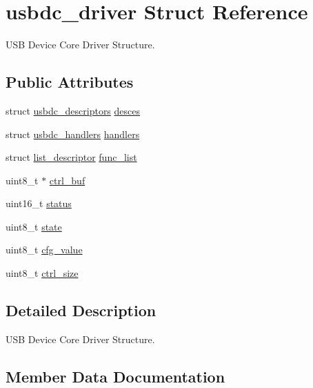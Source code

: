 \hypertarget{structusbdc__driver}{}\section{usbdc\+\_\+driver Struct Reference}
\label{structusbdc__driver}


U\+SB Device Core Driver Structure.  


\subsection*{Public Attributes}
\begin{DoxyCompactItemize}
\item 
struct \hyperlink{structusbdc__descriptors}{usbdc\+\_\+descriptors} \hyperlink{structusbdc__driver_a5653047038bd63ea3973ab3a1e2bc717}{desces}
\item 
struct \hyperlink{structusbdc__handlers}{usbdc\+\_\+handlers} \hyperlink{structusbdc__driver_a3a41aee4eb86d314ff44148bd70a1036}{handlers}
\item 
struct \hyperlink{structlist__descriptor}{list\+\_\+descriptor} \hyperlink{structusbdc__driver_adb143c5cb6bdb90e3410757c9c12436c}{func\+\_\+list}
\item 
uint8\+\_\+t $\ast$ \hyperlink{structusbdc__driver_a224c4c9aa86c207675941f108b43321d}{ctrl\+\_\+buf}
\item 
uint16\+\_\+t \hyperlink{structusbdc__driver_a790fe909a1ec4ce5c9d2df3659530c5b}{status}
\item 
uint8\+\_\+t \hyperlink{structusbdc__driver_a784023454ea918163bd42bb8ff9b418d}{state}
\item 
uint8\+\_\+t \hyperlink{structusbdc__driver_a6cf7b59432446c55e867512218e51bb9}{cfg\+\_\+value}
\item 
uint8\+\_\+t \hyperlink{structusbdc__driver_a494b887240ab0921fd157e0aba882864}{ctrl\+\_\+size}
\end{DoxyCompactItemize}


\subsection{Detailed Description}
U\+SB Device Core Driver Structure. 

\subsection{Member Data Documentation}
\mbox{\label{structusbdc__driver_a6cf7b59432446c55e867512218e51bb9}} 
